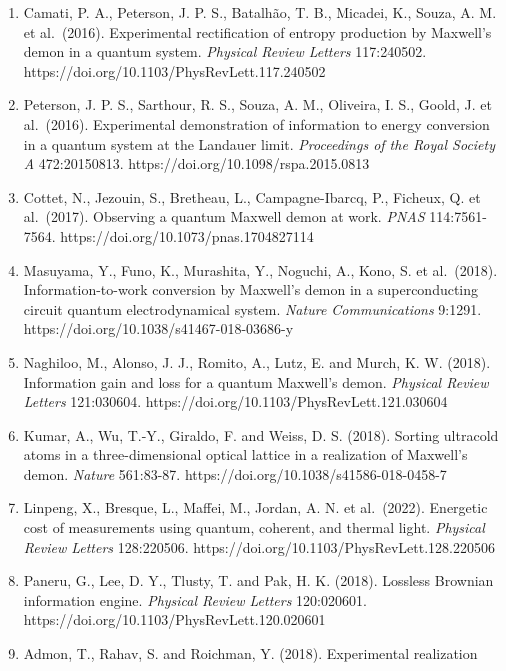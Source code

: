 \documentclass[
  10pt,
]{article}
\begin{document}
\begin{enumerate}
  Pekola, J. P. (2015). On-chip Maxwell's demon as an
  information-powered refrigerator. \emph{Physical Review Letters}
  115:260602. https://doi.org/10.1103/PhysRevLett.115.260602
\item
  Camati, P. A., Peterson, J. P. S., Batalhão, T. B., Micadei, K.,
  Souza, A. M. et al.~(2016). Experimental rectification of entropy
  production by Maxwell's demon in a quantum system. \emph{Physical
  Review Letters} 117:240502.
  https://doi.org/10.1103/PhysRevLett.117.240502
\item
  Peterson, J. P. S., Sarthour, R. S., Souza, A. M., Oliveira, I. S.,
  Goold, J. et al.~(2016). Experimental demonstration of information to
  energy conversion in a quantum system at the Landauer limit.
  \emph{Proceedings of the Royal Society A} 472:20150813.
  https://doi.org/10.1098/rspa.2015.0813
\item
  Cottet, N., Jezouin, S., Bretheau, L., Campagne-Ibarcq, P., Ficheux,
  Q. et al.~(2017). Observing a quantum Maxwell demon at work.
  \emph{PNAS} 114:7561-7564. https://doi.org/10.1073/pnas.1704827114
\item
  Masuyama, Y., Funo, K., Murashita, Y., Noguchi, A., Kono, S. et
  al.~(2018). Information-to-work conversion by Maxwell's demon in a
  superconducting circuit quantum electrodynamical system. \emph{Nature
  Communications} 9:1291. https://doi.org/10.1038/s41467-018-03686-y
\item
  Naghiloo, M., Alonso, J. J., Romito, A., Lutz, E. and Murch, K. W.
  (2018). Information gain and loss for a quantum Maxwell's demon.
  \emph{Physical Review Letters} 121:030604.
  https://doi.org/10.1103/PhysRevLett.121.030604
\item
  Kumar, A., Wu, T.-Y., Giraldo, F. and Weiss, D. S. (2018). Sorting
  ultracold atoms in a three-dimensional optical lattice in a
  realization of Maxwell's demon. \emph{Nature} 561:83-87.
  https://doi.org/10.1038/s41586-018-0458-7
\item
  Linpeng, X., Bresque, L., Maffei, M., Jordan, A. N. et al.~(2022).
  Energetic cost of measurements using quantum, coherent, and thermal
  light. \emph{Physical Review Letters} 128:220506.
  https://doi.org/10.1103/PhysRevLett.128.220506
\item
  Paneru, G., Lee, D. Y., Tlusty, T. and Pak, H. K. (2018). Lossless
  Brownian information engine. \emph{Physical Review Letters}
  120:020601. https://doi.org/10.1103/PhysRevLett.120.020601
\item
  Admon, T., Rahav, S. and Roichman, Y. (2018). Experimental realization

\end{enumerate}
\end{document}
